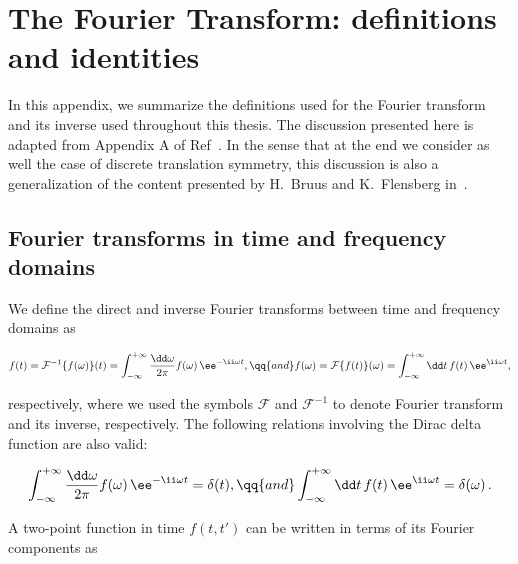 
%

\chapter{The Fourier Transform: definitions and identities}
\label{app:fourier_transform}
\glsresetall

In this appendix, we summarize the definitions used for the Fourier transform and its inverse used throughout this thesis.
The discussion presented here is adapted from Appendix A of Ref~\cite{Bruus_Flensberg_2004}.
In the sense that at the end we consider as well the case of discrete translation symmetry, this discussion is also a generalization of the content presented by H.~Bruus and K.~Flensberg in~\cite{Bruus_Flensberg_2004}.

\section{Fourier transforms in time and frequency domains}

We define the direct and inverse Fourier transforms between time and frequency domains as

\begin{equation}
    f(t) = \mathcal{F}^{-1} \{f(\omega)\} (t) =\int_{-\infty}^{+\infty}\frac{\dd \omega}{2\pi}f(\omega)\,\ee^{-\ii\omega t}, \qq{and} f(\omega) = \mathcal{F} \{f(t)\} (\omega)=\int_{-\infty}^{+\infty}\dd t\,f(t)\,\ee^{\ii\omega t},
\end{equation}

\noindent respectively, where we used the symbols $\mathcal{F}$ and $\mathcal{F}^{-1}$ to denote Fourier transform and its inverse, respectively.
The following relations involving the Dirac delta function are also valid:

\begin{equation}
    \int_{-\infty}^{+\infty}\frac{\dd \omega}{2\pi}f(\omega)\,\ee^{-\ii\omega t}=\delta(t),\qq{and} \int_{-\infty}^{+\infty}\dd t\,f(t)\,\ee^{\ii\omega t}=\delta(\omega)\,.
\end{equation}

\noindent A two-point function in time $f(t,t')$ can be written in terms of its Fourier components as

